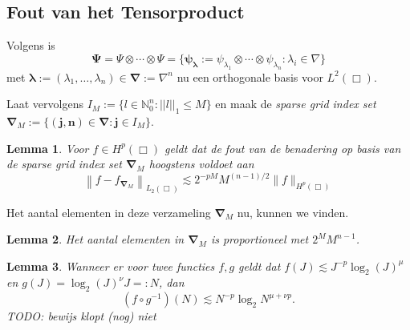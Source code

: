 \documentclass[11pt]{report}
\theoremstyle{plain}
\newtheorem{lemma}{Lemma}
\theoremstyle{definition}
\theoremstyle{remark}
\newcommand{\N}{\mathbb{N}}
\begin{document}
\subsection{Fout van het Tensorproduct}
Volgens \cite[L3.1.7]{tammo} is 
\[ 
  \boldsymbol\Psi = \Psi \otimes \cdots \otimes \Psi = \{ \boldsymbol{\psi_\lambda} := \psi_{\lambda_1} \otimes \cdots \otimes \psi_{\lambda_n}: \lambda_i \in \nabla \}
\]
met $\boldsymbol\lambda := (\lambda_1, \ldots, \lambda_n) \in \boldsymbol{\nabla} := \nabla^n$ nu een orthogonale basis voor $L^2(\Box)$.

Laat vervolgens $I_M := \{ l \in \N^n_0: ||l||_1 \leq M \}$ en maak de \emph{sparse grid index set} $\boldsymbol{\nabla}_M := \{ \boldsymbol{(j,n)} \in \boldsymbol{\nabla}: \boldsymbol{j} \in I_M \}$.

\begin{lemma}{\cite[P3.2.3]{tammo}}
  Voor $f \in H^p(\Box)$ geldt dat de fout van de benadering op basis van de sparse grid index set $\boldsymbol{\nabla}_M$ hoogstens voldoet aan
\[
  \left\| f - f_{\boldsymbol\nabla_M} \right\|_{L_2(\Box)} \lesssim 2^{-pM} M^{(n-1)/2} \| f \|_{H^p(\Box)}
\]
\end{lemma}

Het aantal elementen in deze verzameling $\boldsymbol{\nabla}_M$ nu, kunnen we vinden.
\begin{lemma}{\cite[L3.3.1]{tammo}}
  Het aantal elementen in $\boldsymbol{\nabla}_M$ is proportioneel met $2^M M^{n-1}$.
\end{lemma}

\begin{lemma}
  Wanneer er voor twee functies $f, g$ geldt dat $f(J) \lesssim J^{-p}\log_2(J)^\mu$ en $g(J) = \log_2(J)^\nu J =: N$, dan
  \[
    (f \circ g^{-1})(N) \lesssim N^{-p} \log_2{N}^{\mu + \nu p}.
  \]
  TODO: bewijs klopt (nog) niet
\end{lemma}
\iffalse
\begin{proof}[Bewijs]
  We weten dat $g(J) = N$ dus $g^{-1}(N) = J$. Dan
  \[
    (f \circ g^{-1})(N) = f(J) \simeq J^{-p}\log_2(J)^{\mu}.
  \]
  Omdat verder $J \log_2(J)^\nu = N$, geldt $J^{-1} = N^{-1}\log_2(J)^\nu$. Vul dit in in bovenstaande om te krijgen
  \[
    f(J) \simeq N^{-s} \log_2(J)^{\nu s} \log_2(J)^\mu = N^{-s} \log_2(J)^{\nu s + \mu}????
  \]
\end{proof}
\fi
\end{document}
